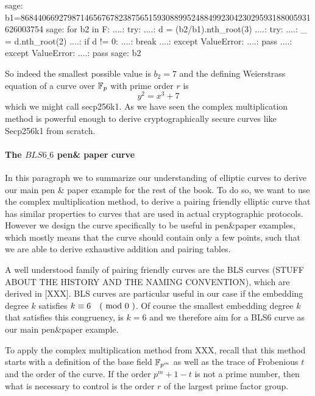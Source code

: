 \begin{example}
\begin{sagecommandline}
sage: b1=86844066927987146567678238756515930889952488499230423029593188005931626003754
sage: for b2 in F:
....:     try:
....:         d = (b2/b1).nth_root(3)
....:         try:
....:             _ = d.nth_root(2)
....:             if d != 0:
....:                 break
....:         except ValueError:
....:             pass
....:     except ValueError:
....:         pass
sage: b2
\end{sagecommandline}
So indeed the smallest possible value is $b_2=7$ and the defining Weierstrass equation of a curve over $\mathbb{F}_p$ with prime order $r$ is 
$$
y^2 = x^3 + 7
$$
which we might call secp256k1. As we have seen the complex multiplication method is powerful enough to derive cryptographically secure curves like Secp256k1 from scratch.
\end{example}

\paragraph{The $BLS6\_6$ pen\& paper curve}
In this paragraph we to summarize our understanding of elliptic curves to derive our main pen \& paper example for the rest of the book. To do so, we want to use the complex multiplication method, to derive a pairing friendly elliptic curve that has similar properties to curves that are used in actual cryptographic protocols. However we design the curve specifically to be useful in pen\&{}paper examples, which mostly means that the curve should contain only a few points, such that we are able to derive exhaustive addition and pairing tables.

A well understood family of pairing friendly curves are the BLS curves (STUFF ABOUT THE HISTORY AND THE NAMING CONVENTION), which are derived in [XXX]. BLS curves are particular useful in our case if the embedding degree $k$ satisfies $k \equiv 6 \quad \text{( mod } 0 \text{ )}$. Of course the smallest embedding degree $k$ that satisfies this congruency, is $k=6$ and we therefore aim for a BLS6 curve as our main pen\&{}paper example. 

To apply the complex multiplication method from XXX, recall that this method starts with a definition of the base field $\mathbb{F}_{p^m}$ as well as the trace of Frobenious $t$ and the order of the curve. If the order $p^m+1-t$ is not a prime number, then  what is necessary to control is the order $r$ of the largest prime factor group. 

